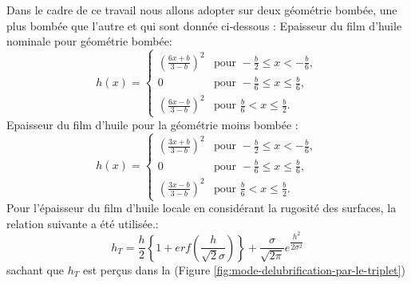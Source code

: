 Dans le cadre de ce travail nous allons adopter sur deux géométrie bombée, une plus bombée que l’autre et qui sont donnée ci‐dessous :
Epaisseur du film d’huile nominale pour géométrie bombée:
\begin{equation}
	h(x) =
	\begin{cases} 
		\left(\frac{6x + b}{3 - b}\right)^2 & \text{pour } -\frac{b}{2} \leq x < -\frac{b}{6}, \\[10pt]
		0 & \text{pour } -\frac{b}{6} \leq x \leq \frac{b}{6}, \\[10pt]
		\left(\frac{6x - b}{3 - b}\right)^2 & \text{pour } \frac{b}{6} < x \leq \frac{b}{2}.
	\end{cases}
\end{equation}
Epaisseur du film d'huile pour la géométrie moins bombée :
\begin{equation}
	h(x) =
	\begin{cases} 
		\left(\frac{3x + b}{3 - b}\right)^2 & \text{pour } -\frac{b}{2} \leq x < -\frac{b}{6}, \\[10pt]
		0 & \text{pour } -\frac{b}{6} \leq x \leq \frac{b}{6}, \\[10pt]
		\left(\frac{3x - b}{3 - b}\right)^2 & \text{pour } \frac{b}{6} < x \leq \frac{b}{2}.
	\end{cases}
\end{equation}
Pour l’épaisseur du film d’huile locale en considérant la rugosité des surfaces, la relation suivante
a été utilisée.\cite{tribo1}:
\begin{equation}
	h_{T} =\frac{h}{2}\left\{1+erf\left(\frac{h}{\sqrt{2}\sigma}\right)\right\}+\frac{\sigma}{\sqrt{2\pi}}e^{\dfrac{h^2}{2\sigma ^2}}
\end{equation}
sachant que $h_T$ est perçus dans la (Figure \ref{fig:mode-delubrification-par-le-triplet})

